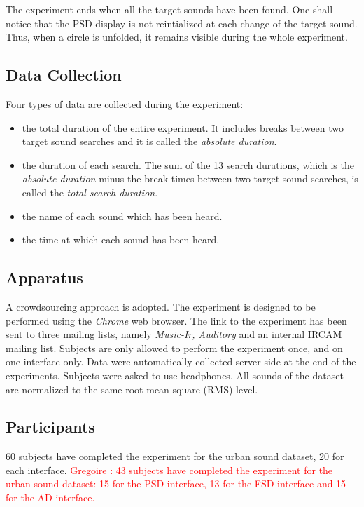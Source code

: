\documentclass{aes2e}
\newcommand{\gl}[1]{\textcolor{red}{Gregoire : #1}}
\begin{document}
The experiment ends when all the target sounds have been found. One shall notice that the PSD display is not reintialized at each change of the target sound. Thus, when a circle is unfolded, it remains visible during the whole experiment.

\subsection{Data Collection}
Four types of data are collected during the experiment:
\begin{itemize}
\item the total duration of the entire experiment. It includes breaks between two target sound searches and it is called the \textit{absolute duration}.
\item the duration of each search. The sum of the 13 search durations, which is the \textit{absolute duration} minus the break times between two target sound searches, is called the \textit{total search duration}.
\item the name of each sound which has been heard.
\item the time at which each sound has been heard.  
\end{itemize}

\subsection{Apparatus}

A crowdsourcing approach is adopted. The experiment is designed to be performed using the \textit{Chrome} web browser. The link to the experiment has been sent to three  mailing lists, namely \textit{Music-Ir, Auditory} and an internal IRCAM mailing list. Subjects are only allowed to perform the experiment once, and on one interface only. Data were automatically collected server-side at the end of the experiments. Subjects were asked to use headphones. All sounds of the dataset are normalized to the same root mean square (RMS) level.

\subsection{Participants}

60 subjects have completed the experiment for the urban sound dataset, 20 for each interface. \gl{43 subjects have completed the experiment for the urban sound dataset: 15 for the PSD interface, 13 for the FSD interface and 15 for the AD interface.}
\end{document}
